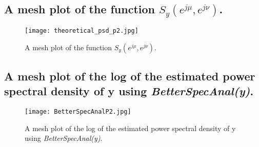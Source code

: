 \documentclass{article}
\begin{document}
\subsection{A mesh plot of the function $S_y(e^{j\mu}, e^{j\nu})$.}
\begin{figure}[h]
    \centering
    \texttt{[image: theoretical\_psd\_p2.jpg]}
    \caption{A mesh plot of the function $S_y(e^{j\mu}, e^{j\nu})$.}
    \label{fig:8}
\end{figure}
\newpage
\subsection{A mesh plot of the log of the estimated power spectral density of y using \textit{BetterSpecAnal(y)}.}
\begin{figure}[h]
    \centering
    \texttt{[image: BetterSpecAnalP2.jpg]}
    \caption{A mesh plot of the log of the estimated power spectral density of y using \textit{BetterSpecAnal(y)}.}
    \label{fig:9}
\end{figure}
\end{document}
